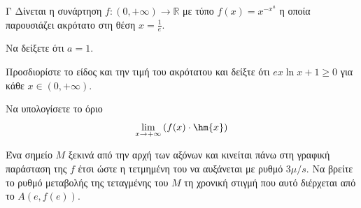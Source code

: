 \begin{thema}{Γ}
Δίνεται η συνάρτηση $f:(0,+\infty)\to\mathbb{R}$ με τύπο $f(x)=x^{-x^a}$ η οποία παρουσιάζει ακρότατο στη θέση $x=\frac{1}{e}$.
\begin{erwthma}
\item Να δείξετε ότι $a=1$.
\item Προσδιορίστε το είδος και την τιμή του ακρότατου και δείξτε ότι $ex\ln{x}+1\geq 0$ για κάθε $x\in(0,+\infty)$.
\item Να υπολογίσετε το όριο
\[ \lim\limits_{x\to+\infty}{\left(f(x)\cdot\hm{x}\right)} \]
\item Ένα σημείο $M$ ξεκινά από την αρχή των αξόνων και κινείται πάνω στη γραφική παράσταση της $f$ έτσι ώστε η τετμημένη του να αυξάνεται με ρυθμό $3\mu/\si{s}$. Να βρείτε το ρυθμό μεταβολής της τεταγμένης του $M$ τη χρονική στιγμή που αυτό διέρχεται από το $A\left(e,f(e)\right)$.
\end{erwthma}
\end{thema}
